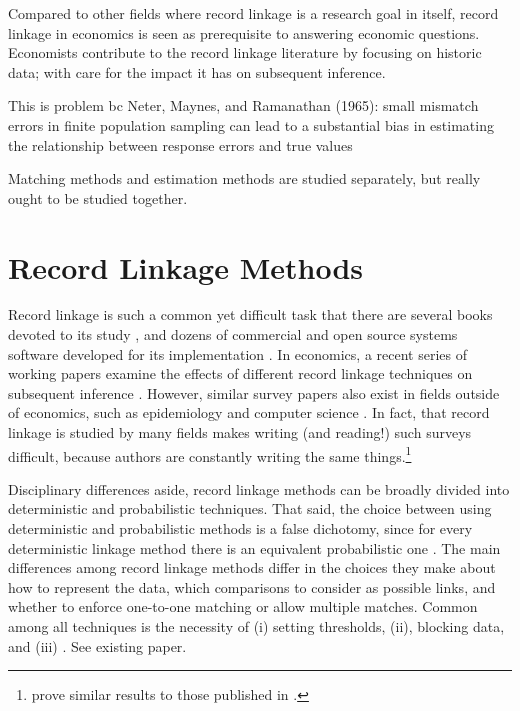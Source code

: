 \documentclass[12pt]{article}
\begin{document}
Compared to other fields where record linkage is a research goal in itself, record linkage in economics is seen as prerequisite to answering economic questions.  Economists contribute to the record linkage literature by focusing on historic data; with care for the impact it has on subsequent inference.   

This is problem bc  Neter, Maynes, and Ramanathan (1965): small mismatch errors in finite population sampling can lead to a substantial bias in estimating the relationship between response errors and true values

Matching methods and estimation methods are studied separately, but really ought to be studied together. 

\section{Record Linkage Methods}

Record linkage is such a common yet difficult task that there are several books devoted to its study \citep{harron_book, christen2012, herzog07}, and dozens of commercial and open source systems software developed for its implementation \citep{kopcke2010}.  In economics, a recent series of working papers examine the effects of different record linkage techniques on subsequent inference \citep{abe2019, bailey2017}.  However, similar survey papers also exist in fields outside of economics, such as epidemiology and computer science \citep{harron2018, winkler99}.   In fact, that record linkage is studied by many fields makes writing (and reading!) such surveys difficult, because authors are constantly writing the same things.\footnote{\cite{Goldstein2012} prove similar results to those published in \cite{hirukawa2018}.}

Disciplinary differences aside, record linkage methods can be broadly divided into deterministic and probabilistic techniques.  That said, the choice between using deterministic and probabilistic methods is a false dichotomy, since for every deterministic linkage method there is an equivalent probabilistic one \citep{harron2018}.  The main differences among record linkage methods differ in the choices they make about how to represent the data, which comparisons to consider as possible links, and whether to enforce one-to-one matching or allow multiple matches.  Common among all techniques is the necessity of (i) setting thresholds, (ii), blocking data, and (iii) . See existing paper. 
\end{document}
